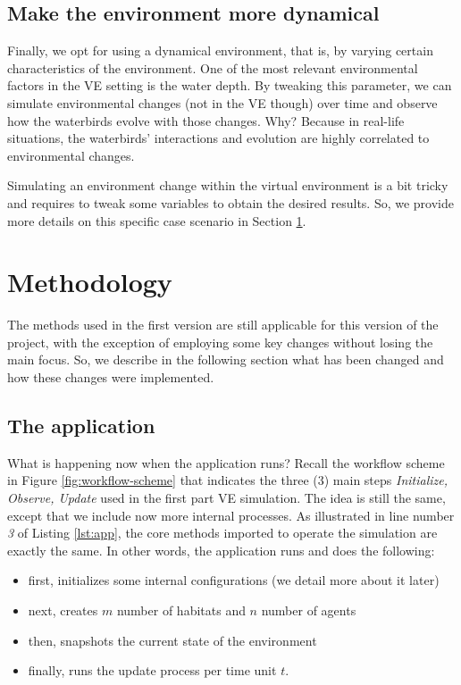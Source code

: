 \subsection{Make the environment more dynamical}
Finally, we opt for using a dynamical environment, that is, by varying certain characteristics of the environment. One of the most relevant environmental factors in the VE setting is the water depth. By tweaking this parameter, we can simulate environmental changes (not in the VE though) over time and observe how the waterbirds evolve with those changes. Why? Because in real-life situations, the waterbirds' interactions and evolution are highly correlated to environmental changes.

Simulating an environment change within the virtual environment is a bit tricky and requires to tweak some variables to obtain the desired results. So, we provide more details on this specific case scenario in Section \ref{sec:methodology}.


\section{Methodology}\label{sec:methodology}
The methods used in the first version are still applicable for this version of the project, with the exception of employing some key changes without losing the main focus. So, we describe in the following section what has been changed and how these changes were implemented.

\subsection{The application}
What is happening now when the application runs? Recall the workflow scheme in Figure \ref{fig:workflow-scheme} that indicates the three (3) main steps \textit{Initialize, Observe, Update} used in the first part VE simulation. The idea is still the same, except that we include now more internal processes. As illustrated in line number \emph{3} of Listing \ref{lst:app}, the core methods imported to operate the simulation are exactly the same. In other words, the application runs and does the following:
\begin{itemize}
    \item first, initializes some internal configurations (we detail more about it later)
    \item next, creates $m$ number of habitats and $n$ number of agents
    \item then, snapshots the current state of the environment
    \item finally, runs the update process per time unit $t$.
\end{itemize}

